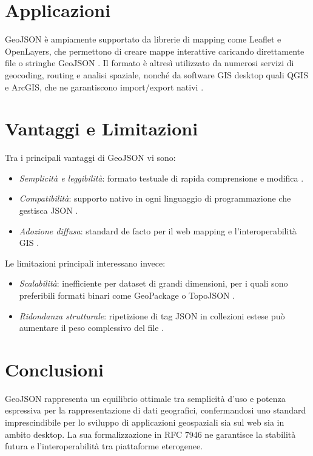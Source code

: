 \section{Applicazioni}
GeoJSON è ampiamente supportato da librerie di mapping come Leaflet e OpenLayers,
che permettono di creare mappe interattive caricando direttamente file o stringhe
GeoJSON \cite{leaflet-geojson,openlayers-geojson}. Il formato è altresì
utilizzato da numerosi servizi di geocoding, routing e analisi spaziale, nonché
da software GIS desktop quali QGIS e ArcGIS, che ne garantiscono import/export nativi
\cite{arcgis-geojson}.

\section{Vantaggi e Limitazioni}
Tra i principali vantaggi di GeoJSON vi sono:
\begin{itemize}
  \item \emph{Semplicità e leggibilità}: formato testuale di rapida comprensione
    e modifica \cite{when-use-geojson}.

  \item \emph{Compatibilità}: supporto nativo in ogni linguaggio di programmazione
    che gestisca JSON \cite{geojson-spec}.

  \item \emph{Adozione diffusa}: standard de facto per il web mapping e l'interoperabilità
    GIS \cite{gdal-geojson}.
\end{itemize}
Le limitazioni principali interessano invece:
\begin{itemize}
  \item \emph{Scalabilità}: inefficiente per dataset di grandi dimensioni, per i
    quali sono preferibili formati binari come GeoPackage o TopoJSON
    \cite{when-use-geojson}.

  \item \emph{Ridondanza strutturale}: ripetizione di tag JSON in collezioni estese
    può aumentare il peso complessivo del file \cite{when-use-geojson}.
\end{itemize}

\section{Conclusioni}
GeoJSON rappresenta un equilibrio ottimale tra semplicità d'uso e potenza
espressiva per la rappresentazione di dati geografici, confermandosi uno standard
imprescindibile per lo sviluppo di applicazioni geospaziali sia sul web sia in ambito
desktop. La sua formalizzazione in RFC 7946 ne garantisce la stabilità futura e
l'interoperabilità tra piattaforme eterogenee.